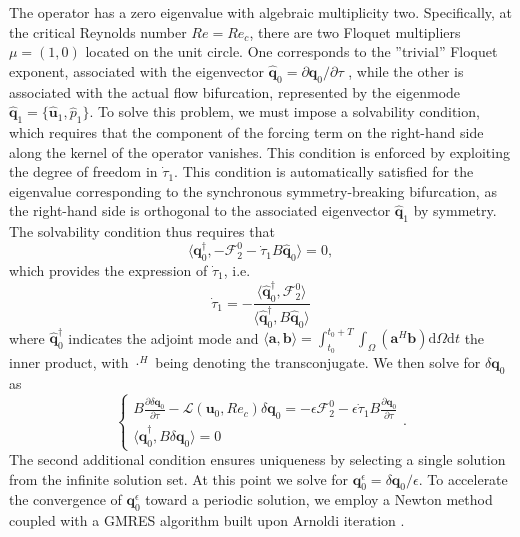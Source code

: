 The operator has a zero eigenvalue with algebraic multiplicity two. Specifically, at the critical Reynolds number $Re=Re_c$, there are two Floquet multipliers $\mu=(1,0)$ located on the unit circle. One corresponds to the ''trivial'' Floquet exponent, associated with the eigenvector $\hat{\bm{q}}_0 = \partial \bm{q}_0/\partial \tau$ \citep{}, while the other is associated with the actual flow bifurcation, represented by the eigenmode $\hat{\bm{q}}_1 = \{ \hat{\bm{u}}_1, \hat{p}_1 \}$. To solve this problem, we must impose a solvability condition, which requires that the component of the forcing term on the right-hand side along the kernel of the operator vanishes. This condition is enforced by exploiting the degree of freedom in $\dot{\tau}_1$. This condition is automatically satisfied for the eigenvalue corresponding to the synchronous symmetry-breaking bifurcation, as the right-hand side is orthogonal to the associated eigenvector $\hat{\bm{q}}_1$ by symmetry. The solvability condition thus requires that
%
\begin{equation}
  \langle \bm{\bm{q}}_0^\dagger, - \mathcal{F}_2^0 - \dot{\tau}_1 B \hat{\bm{q}}_0 \rangle = 0,
\end{equation} 
%
which provides the expression of $\dot{\tau}_1$, i.e.
%
\begin{equation}
  \dot{\tau}_1 = - \frac{ \langle \hat{\bm{q}}_0^\dagger, \mathcal{F}_2^0 \rangle }{ \langle \hat{\bm{q}}_0^\dagger, B \hat{\bm{q}}_0 \rangle}
\end{equation}
%
where $\hat{\bm{q}}_0^\dagger$ indicates the adjoint mode and $\langle \bm{a},\bm{b} \rangle = \int_{t_0}^{t_0+T} \int_{\Omega} \left( \bm{a}^H \bm{b} \right) \text{d}\Omega \text{d}t$ the inner product, with $\cdot^H$ being denoting the transconjugate.
%
We then solve for $\delta \bm{q}_0$ as
%
\begin{equation}
  \begin{cases}
  B \frac{\partial \delta \bm{q}_0}{\partial \tau} - \mathcal{L}(\bm{u}_0,Re_c) \delta \bm{q}_0 = - \epsilon \mathcal{F}_2^0 - \epsilon \dot{\tau}_1 B \frac{\partial \bm{q}_0}{\partial \tau} \\
  \langle \hat{\bm{q}}_0^\dagger, B \delta \bm{q}_0 \rangle = 0
  \end{cases}.
\end{equation}
%
The second additional condition ensures uniqueness by selecting a single solution from the infinite solution set. At this point we solve for $\bm{q}_0^\epsilon  = \delta \bm{q}_0/\epsilon$. To accelerate the convergence of $\bm{q}_0^\epsilon$ toward a periodic solution, we employ a Newton method coupled with a GMRES algorithm built upon Arnoldi iteration \citep{}.

